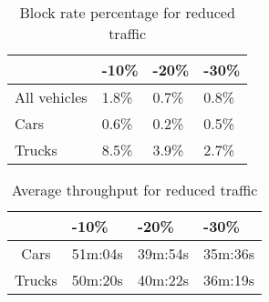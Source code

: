 \begin{table}
	\centering
	\begin{tabular}{l|l|l|l|}
		\cline{2-4}
		& -10\% & -20\% & -30\% \\ \hline
		\multicolumn{1}{|l|}{All vehicles} & 1.8\% & 0.7\% & 0.8\% \\ \hline
		\multicolumn{1}{|l|}{Cars}         & 0.6\% & 0.2\% & 0.5\% \\ \hline
		\multicolumn{1}{|l|}{Trucks}       & 8.5\% & 3.9\% & 2.7\% \\ \hline
	\end{tabular}
	\caption{Block rate percentage for reduced traffic}
	\label{tab:blockRed}
\end{table}

\begin{table}
	\centering
	\begin{tabular}{c|c|c|c|}
		\cline{2-4}
		\multicolumn{1}{l|}{}        & \multicolumn{1}{l|}{-10\%} & \multicolumn{1}{l|}{-20\%} & \multicolumn{1}{l|}{-30\%} \\ \hline
		\multicolumn{1}{|c|}{Cars}   & 51m:04s                    & 39m:54s                    & 35m:36s                    \\ \hline
		\multicolumn{1}{|c|}{Trucks} & 50m:20s                    & 40m:22s                    & 36m:19s                    \\ \hline
	\end{tabular}
	\caption{Average throughput for reduced traffic}
	\label{tab:throughputDec}
\end{table}